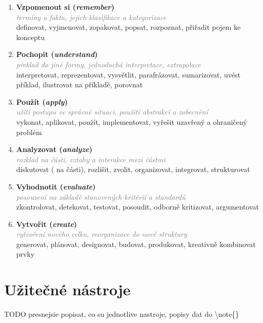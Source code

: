\documentclass[twoside,openany,10pt]{book}
\newcommand{\note}[1]{\textcolor{gray}{\small\itshape #1}}
\begin{document}
\begin{enumerate}[leftmargin=*]
\item \textbf{Vzpomenout si (\textit{remember})}\\
\note{termíny a fakta, jejich klasifikace a kategorizace}\\
{\small definovat, vyjmenovat, zopakovat, popsat, rozpoznat, přiřadit pojem ke konceptu}

\item \textbf{Pochopit (\textit{understand})}\\
\note{překlad do jiné formy, jednoduchá interpretace, extrapolace}\\
{\small interpretovat, reprezentovat, vysvětlit, parafrázovat, sumarizovat, uvést příklad, ilustrovat na příkladě, porovnat}

\item \textbf{Použít (\textit{apply})}\\
\note{užití postupu ve správné situaci, použití abstrakcí a zobecnění}\\
{\small vykonat, aplikovat, použít, implementovat, vyřešit uzavřený a ohraničený problém}

\item \textbf{Analyzovat (\textit{analyze})}\\
\note{rozklad na části, vztahy a interakce mezi částmi}\\
{\small diskutovat ( na části), rozlišit, zvolit, organizovat, integrovat, strukturovat}

\item \textbf{Vyhodnotit (\textit{evaluate})}\\
\note{posouzení na základě stanovených kritérií a standardů}\\
{\small zkontrolovat, detekovat, testovat, posoudit, odborně kritizovat, argumentovat}

\item \textbf{Vytvořit (\textit{create})}\\
\note{vytvoření nového celku, reorganizace do nové struktury}\\
{\small generovat, plánovat, designovat, budovat, produkovat, kreativně kombinovat prvky}
\end{enumerate}

\chapter*{Užitečné nástroje}

TODO presnejsie popisat, co su jednotlive nastroje, popisy dat do \textbackslash{}note\{\}
\end{document}

